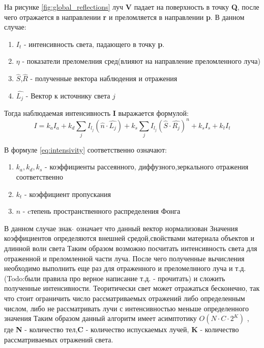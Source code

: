 \documentclass[a4paper,14pt, unknownkeysallowed]{extreport}
\begin{document}
На рисунке  \ref{fig:global_reflections} луч \textbf{V} падает на поверхность в точку \textbf{Q}, после чего отражается в направлении \textbf{r} и преломляется
в направлении \textbf{p}.
В данном случае:
\begin{enumerate}
	\item $I_t$ - интенсивность света, падающего в точку \textbf{p}.
	\item $\eta$ - показатели преломелния сред(влияют на направление преломленного луча)
	\item $\hat{S}$,$\hat{R}$ - полученные вектора наблюдения и отражения
	\item $\hat{L_j}$ - Вектор к источнику света $j$

\end{enumerate}

Тогда наблюдаемая интенсивность \textbf{I} выражается формулой:
\begin{equation} 
	I = k_aI_a + k_d \sum_{j} I_{l_j}(\hat{n} \cdot \hat{L_j}) + k_s \sum_{j} I_{l_j}(\hat{S} \cdot \hat{R_j})^n + k_sI_s + k_tI_t
	\label{eq:intensivity}
\end{equation}

В формуле \ref{eq:intensivity} соответственно означают:
\begin{enumerate}
	\item $k_a,k_d,k_s$ - коэффициенты рассеянного, диффузного,зеркального отражения соответственно
	\item $k_t$ - коэффициент пропускания
	\item $n$ - cтепень пространственного распределения Фонга
\end{enumerate}
В данном случае знак $ \hat{} $  означает что данный вектор нормализован
Значения коэффициентов определяются внешней средой,свойствами материала объектов и длинной волн света
Таким образом возможно посчитать интенсивность света для отраженной и преломленной части луча.
После чего полученные вычисления необходимо выполнить еще раз для отраженного и преломелнного луча и т.д.(Todo:были правила про верное написание т.д. - прочитать)
и сложить полученные интенсивности.
Теоритически свет может отражаться бесконечно, так что стоит ограничить число рассматриваемых отражений либо определенным числом,
либо не рассматривать лучи с интенсивностью меньше определенного значения
Таким образом данный алгоритм имеет асимптотику $O(N \cdot C \cdot 2^{K})$ , где \textbf{N} - количество тел,\textbf{C} - количество испускаемых лучей,
\textbf{K} - количество рассматриваемых отражений света. \cite{Rodgers}
\end{document}
